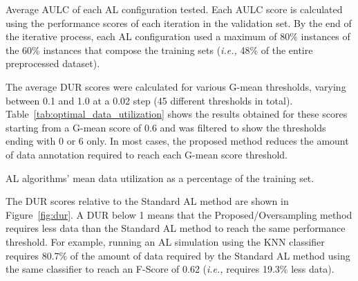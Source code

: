 \documentclass[10pt,journal,compsoc]{IEEEtran}
\begin{document}
\begin{table}
	\centering
    \setlength{\tabcolsep}{2.5pt}
    \caption{\label{tab:aulc_scores}
        Average AULC of each AL configuration tested. Each AULC score is
        calculated using the performance scores of each iteration in the
        validation set. By the end of the iterative process, each AL
        configuration used a maximum of 80\% instances of the 60\% instances
        that compose the training sets (\textit{i.e.,} 48\% of the entire
        preprocessed dataset).
    }
\end{table}

The average DUR scores were calculated for various G-mean thresholds, varying
between 0.1 and 1.0 at a 0.02 step (45 different thresholds in total).
Table~\ref{tab:optimal_data_utilization} shows the results obtained for these
scores starting from a G-mean score of 0.6 and was filtered to show the
thresholds ending with 0 or 6 only. In most cases, the proposed method reduces
the amount of data annotation required to reach each G-mean score threshold.

\begin{table}
    \centering
    \setlength{\tabcolsep}{2.5pt}
    \caption{\label{tab:optimal_data_utilization}
        AL algorithms' mean data utilization as a percentage of the
        training set.
    }
\end{table}

The DUR scores relative to the Standard AL method are shown in
Figure~\ref{fig:dur}. A DUR below 1 means that the Proposed/Oversampling
method requires less data than the Standard AL method to reach the same
performance threshold. For example, running an AL simulation using the KNN
classifier requires 80.7\% of the amount of data required by the Standard AL
method using the same classifier to reach an F-Score of 0.62 (\textit{i.e.,}
requires 19.3\% less data).
\end{document}
